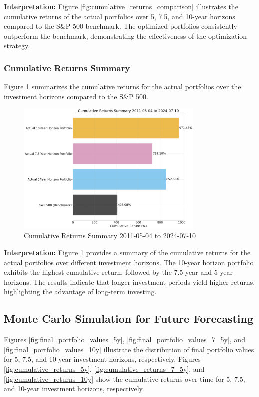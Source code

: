 \textbf{Interpretation:} Figure \ref{fig:cumulative_returns_comparison} illustrates the cumulative returns of the actual portfolios over 5, 7.5, and 10-year horizons compared to the S\&P 500 benchmark. The optimized portfolios consistently outperform the benchmark, demonstrating the effectiveness of the optimization strategy.

\subsubsection{Cumulative Returns Summary}
Figure \ref{fig:cumulative_returns_summary} summarizes the cumulative returns for the actual portfolios over the investment horizons compared to the S\&P 500.

\begin{figure}[!htbp]
    \centering
    \includegraphics[width=0.8\textwidth]{../Figures/cumulative_returns_summary.png}
    \caption{Cumulative Returns Summary 2011-05-04 to 2024-07-10}
    \label{fig:cumulative_returns_summary}
\end{figure}

\textbf{Interpretation:} Figure \ref{fig:cumulative_returns_summary} provides a summary of the cumulative returns for the actual portfolios over different investment horizons. The 10-year horizon portfolio exhibits the highest cumulative return, followed by the 7.5-year and 5-year horizons. The results indicate that longer investment periods yield higher returns, highlighting the advantage of long-term investing.








\subsection{Monte Carlo Simulation for Future Forecasting}
Figures \ref{fig:final_portfolio_values_5y}, \ref{fig:final_portfolio_values_7_5y}, and \ref{fig:final_portfolio_values_10y} illustrate the distribution of final portfolio values for 5, 7.5, and 10-year investment horizons, respectively. Figures \ref{fig:cumulative_returns_5y}, \ref{fig:cumulative_returns_7_5y}, and \ref{fig:cumulative_returns_10y} show the cumulative returns over time for 5, 7.5, and 10-year investment horizons, respectively.


